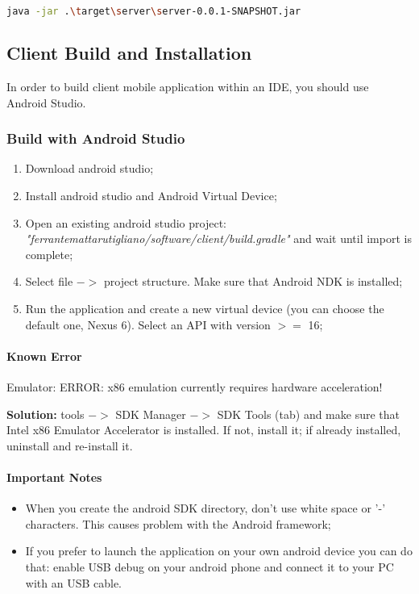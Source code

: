\documentclass[a4paper]{article}
\begin{document}
\begin{lstlisting}[language=bash]
java -jar .\target\server\server-0.0.1-SNAPSHOT.jar
\end{lstlisting}

\subsection{Client Build and Installation}
In order to build client mobile application within an IDE, you should use Android Studio.

\subsubsection{Build with Android Studio}
\begin{enumerate}
    \item Download android studio;
    \item Install android studio and Android Virtual Device;
    \item Open an existing android studio project:
    \newline\textit{"ferrantemattarutigliano/software/client/build.gradle"} and wait until import is complete;
    \item Select file ${->}$ project structure. Make sure that Android NDK is installed;
    \item Run the application and create a new virtual device (you can choose the default one, Nexus 6). Select an API with version ${>=}$ 16;
\end{enumerate}

\paragraph{Known Error}
Emulator: ERROR: x86 emulation currently requires hardware acceleration!

\textbf{Solution:} tools ${->}$ SDK Manager ${->}$ SDK Tools (tab) and make sure that Intel x86 Emulator Accelerator is installed. If not, install it; if already installed, uninstall and re-install it.

\paragraph{Important Notes}
\begin{itemize}
    \item When you create the android SDK directory, don't use white space or '-' characters. This causes problem with the Android framework;
    \item If you prefer to launch the application on your own android device you can do that: enable USB debug on your android phone and connect it to your PC with an USB cable.
\end{itemize}
\end{document}
